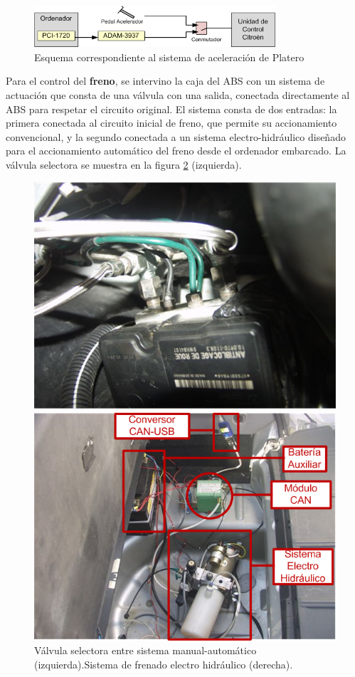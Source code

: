 \begin{figure}[htb]
\centering
\includegraphics[width=0.8\textwidth]{figures/FuncionamientoAcelerador.png}
\caption{Esquema correspondiente al sistema de aceleración de Platero}
\label{fig:esAce}
\end{figure} 

Para el control del \textbf{freno}, se intervino la caja del \gls{ABS} con un sistema de actuación que consta de una válvula con una salida, conectada directamente al \gls{ABS} para respetar el circuito original. El sistema consta de dos entradas: la primera conectada al circuito inicial de freno, que permite su accionamiento convencional, y la segundo conectada a un sistema electro-hidráulico diseñado para el accionamiento automático del freno desde el ordenador embarcado. La válvula selectora se muestra en la figura \ref{fig:sysFre} (izquierda).

\begin{figure}[ht]
\begin{minipage}[b]{0.5\linewidth}
\centering
\includegraphics[width=0.8\linewidth]{figures/ValvulaFrenada.png}
\end{minipage}
\begin{minipage}[b]{0.5\linewidth}
\centering
\includegraphics[width=0.8\linewidth]{figures/SistemaFrenada.png}
\end{minipage}
\caption{Válvula selectora entre sistema manual-automático (izquierda).Sistema de frenado electro hidráulico (derecha).}
\label{fig:sysFre}
\end{figure} 

